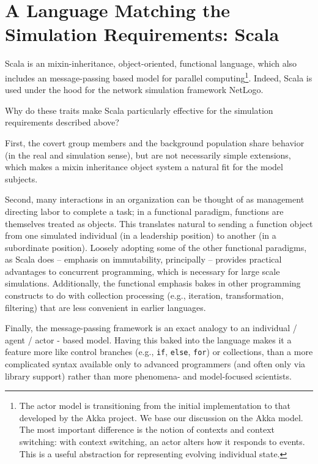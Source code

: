 \documentclass{article}
\begin{document}
\section*{A Language Matching the Simulation Requirements: Scala}
Scala\cite{odersky2004overview} is an mixin-inheritance\cite{bracha1990mixin}, object-oriented, functional language, which also includes an message-passing based model for parallel computing\footnote{The actor model is transitioning from the initial implementation to that developed by the Akka project\cite{akka}.  We base our discussion on the Akka model.  The most important difference is the notion of contexts and context switching: with context switching, an actor alters how it responds to events.  This is a useful abstraction for representing evolving individual state.}.  Indeed, Scala is used under the hood for the network simulation framework NetLogo.

Why do these traits make Scala particularly effective for the simulation requirements described above?  

First, the covert group members and the background population share behavior (in the real and simulation sense), but are not necessarily simple extensions, which makes a mixin inheritance object system a natural fit for the model subjects.

Second, many interactions in an organization can be thought of as management directing labor to complete a task; in a functional paradigm, functions are themselves treated as objects.  This translates natural to sending a function object from one simulated individual (in a leadership position) to another (in a subordinate position).  Loosely adopting some of the other functional paradigms, as Scala does -- emphasis on immutability, principally -- provides practical advantages to concurrent programming, which is necessary for large scale simulations.  Additionally, the functional emphasis bakes in other programming constructs to do with collection processing (e.g., iteration, transformation, filtering) that are less convenient in earlier languages.

Finally, the message-passing framework is an exact analogy to an individual / agent / actor - based model.  Having this baked into the language makes it a feature more like control branches (e.g., \texttt{if}, \texttt{else}, \texttt{for}) or collections, than a more complicated syntax available only to advanced programmers (and often only via library support) rather than more phenomena- and model-focused scientists.
\end{document}
